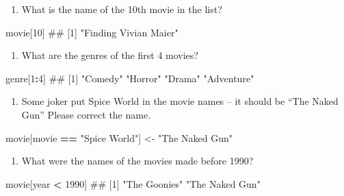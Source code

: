 \documentclass[]{book}
\newenvironment{Shaded}{\begin{snugshade}}{\end{snugshade}}
\newcommand{\DecValTok}[1]{\textcolor[rgb]{0.00,0.00,0.81}{#1}}
\newcommand{\StringTok}[1]{\textcolor[rgb]{0.31,0.60,0.02}{#1}}
\newcommand{\OperatorTok}[1]{\textcolor[rgb]{0.81,0.36,0.00}{\textbf{#1}}}
\newcommand{\NormalTok}[1]{#1}
\providecommand{\tightlist}{%
  \setlength{\itemsep}{0pt}\setlength{\parskip}{0pt}}
\theoremstyle{definition}
\theoremstyle{definition}
\theoremstyle{remark}
\begin{document}
\begin{enumerate}
\def\labelenumi{\arabic{enumi}.}
\tightlist
\item
  What is the name of the 10th movie in the list?
\end{enumerate}

\begin{Shaded}
\begin{Highlighting}[]
\NormalTok{movie[}\DecValTok{10}\NormalTok{]}
\NormalTok{## [1] "Finding Vivian Maier"}
\end{Highlighting}
\end{Shaded}

\begin{enumerate}
\def\labelenumi{\arabic{enumi}.}
\setcounter{enumi}{1}
\tightlist
\item
  What are the genres of the first 4 movies?
\end{enumerate}

\begin{Shaded}
\begin{Highlighting}[]
\NormalTok{genre[}\DecValTok{1}\OperatorTok{:}\DecValTok{4}\NormalTok{]}
\NormalTok{## [1] "Comedy"    "Horror"    "Drama"     "Adventure"}
\end{Highlighting}
\end{Shaded}

\begin{enumerate}
\def\labelenumi{\arabic{enumi}.}
\setcounter{enumi}{2}
\tightlist
\item
  Some joker put Spice World in the movie names -- it should be ``The
  Naked Gun'' Please correct the name.
\end{enumerate}

\begin{Shaded}
\begin{Highlighting}[]
\NormalTok{movie[movie }\OperatorTok{==}\StringTok{ "Spice World"}\NormalTok{] <-}\StringTok{ "The Naked Gun"}
\end{Highlighting}
\end{Shaded}

\begin{enumerate}
\def\labelenumi{\arabic{enumi}.}
\setcounter{enumi}{3}
\tightlist
\item
  What were the names of the movies made before 1990?
\end{enumerate}

\begin{Shaded}
\begin{Highlighting}[]
\NormalTok{movie[year }\OperatorTok{<}\StringTok{ }\DecValTok{1990}\NormalTok{]}
\NormalTok{## [1] "The Goonies"   "The Naked Gun"}
\end{Highlighting}
\end{Shaded}
\end{document}
